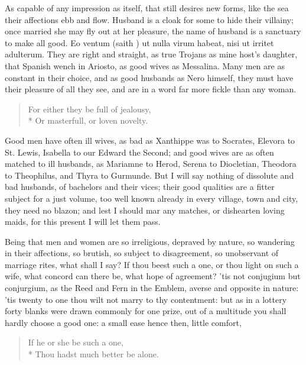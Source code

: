 As capable of any impression as  itself, that still
desires new forms, like the sea their affections ebb and flow. Husband
is a cloak for some to hide their villainy; once married she may fly
out at her pleasure, the name of husband is a sanctuary to make all
good. Eo ventum (saith \Seneca{}) ut nulla virum habeat, nisi ut irritet
adulterum. They are right and straight, as true Trojans as mine host's
daughter, that Spanish wench in Ariosto, as good wives as
Messalina. Many men are as constant in their choice, and as good
husbands as Nero himself, they must have their pleasure of all they
see, and are in a word far more fickle than any woman.
%
\begin{verse}
For either they be full of jealousy,\\*
Or masterfull, or loven novelty.
\end{verse}

Good men have often ill wives, as bad as Xanthippe was to Socrates,
Elevora to St. Lewis, Isabella to our Edward the Second; and good wives
are as often matched to ill husbands, as Mariamne to Herod, Serena to
Diocletian, Theodora to Theophilus, and Thyra to Gurmunde. But I will
say nothing of dissolute and bad husbands, of bachelors and their
vices; their good qualities are a fitter subject for a just volume, too
well known already in every village, town and city, they need no
blazon; and lest I should mar any matches, or dishearten loving maids,
for this present I will let them pass.

Being that men and women are so irreligious, depraved by nature, so
wandering in their affections, so brutish, so subject to disagreement,
so unobservant of marriage rites, what shall I say? If thou beest such
a one, or thou light on such a wife, what concord can there be, what
hope of agreement? 'tis not conjugium but conjurgium, as the Reed and
Fern in the Emblem, averse and opposite in nature: 'tis twenty to
one thou wilt not marry to thy contentment: but as in a lottery forty
blanks were drawn commonly for one prize, out of a multitude you shall
hardly choose a good one: a small ease hence then, little comfort,

\begin{verse}
If he or she be such a one,\\*
Thou hadst much better be alone.
\end{verse}

